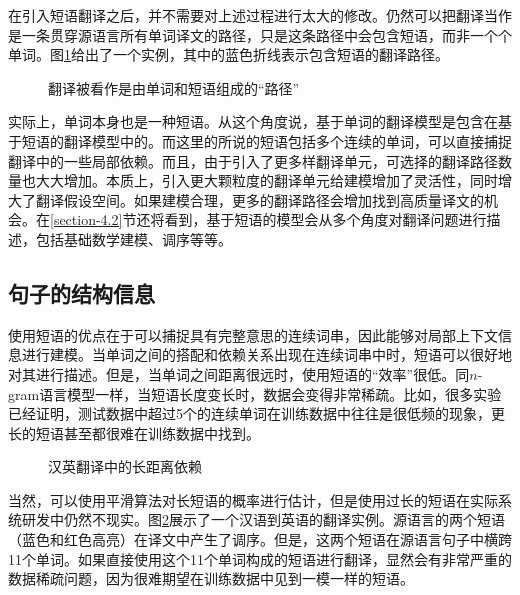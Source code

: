 \parinterval 在引入短语翻译之后，并不需要对上述过程进行太大的修改。仍然可以把翻译当作是一条贯穿源语言所有单词译文的路径，只是这条路径中会包含短语，而非一个个单词。图\ref{fig:4-5}给出了一个实例，其中的蓝色折线表示包含短语的翻译路径。

\begin{figure}[htp]
\centering

\caption{翻译被看作是由单词和短语组成的``路径''}
\label{fig:4-5}
\end{figure}

\parinterval 实际上，单词本身也是一种短语。从这个角度说，基于单词的翻译模型是包含在基于短语的翻译模型中的。而这里的所说的短语包括多个连续的单词，可以直接捕捉翻译中的一些局部依赖。而且，由于引入了更多样翻译单元，可选择的翻译路径数量也大大增加。本质上，引入更大颗粒度的翻译单元给建模增加了灵活性，同时增大了翻译假设空间。如果建模合理，更多的翻译路径会增加找到高质量译文的机会。在\ref{section-4.2}节还将看到，基于短语的模型会从多个角度对翻译问题进行描述，包括基础数学建模、调序等等。


\subsection{句子的结构信息}

\parinterval 使用短语的优点在于可以捕捉具有完整意思的连续词串，因此能够对局部上下文信息进行建模。当单词之间的搭配和依赖关系出现在连续词串中时，短语可以很好地对其进行描述。但是，当单词之间距离很远时，使用短语的``效率''很低。同$n$-gram语言模型一样，当短语长度变长时，数据会变得非常稀疏。比如，很多实验已经证明，测试数据中超过5个的连续单词在训练数据中往往是很低频的现象，更长的短语甚至都很难在训练数据中找到。

\begin{figure}[htp]
\centering

\caption{汉英翻译中的长距离依赖}
\label{fig:4-6}
\end{figure}

\parinterval 当然，可以使用平滑算法对长短语的概率进行估计，但是使用过长的短语在实际系统研发中仍然不现实。图\ref{fig:4-6}展示了一个汉语到英语的翻译实例。源语言的两个短语（蓝色和红色高亮）在译文中产生了调序。但是，这两个短语在源语言句子中横跨11个单词。如果直接使用这个11个单词构成的短语进行翻译，显然会有非常严重的数据稀疏问题，因为很难期望在训练数据中见到一模一样的短语。

